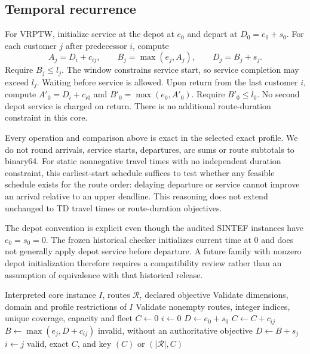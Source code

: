 \subsection{Temporal recurrence}
For VRPTW, initialize service at the depot at $e_0$ and depart at $D_0=e_0+s_0$. For each customer $j$ after predecessor $i$, compute
\[
A_j=D_i+c_{ij},\qquad B_j=\max(e_j,A_j),\qquad D_j=B_j+s_j.
\]
Require $B_j\leq l_j$. The window constrains service start, so service completion may exceed $l_j$. Waiting before service is allowed. Upon return from the last customer $i$, compute $A'_0=D_i+c_{i0}$ and $B'_0=\max(e_0,A'_0)$. Require $B'_0\leq l_0$. No second depot service is charged on return. There is no additional route-duration constraint in this core.

Every operation and comparison above is exact in the selected exact profile. We do not round arrivals, service starts, departures, arc sums or route subtotals to binary64. For static nonnegative travel times with no independent duration constraint, this earliest-start schedule suffices to test whether any feasible schedule exists for the route order: delaying departure or service cannot improve an arrival relative to an upper deadline. This reasoning does not extend unchanged to TD travel times or route-duration objectives.

The depot convention is explicit even though the audited SINTEF instances have $e_0=s_0=0$. The frozen historical checker initializes current time at 0 and does not generally apply depot service before departure. A future family with nonzero depot initialization therefore requires a compatibility review rather than an assumption of equivalence with that historical release.

\begin{algorithm}[htbp]
\caption{Exact evaluation of a materialized static solution}
\begin{algorithmic}[1]
\Require Interpreted core instance $I$, routes $\mathcal R$, declared objective
\State Validate dimensions, domain and profile restrictions of $I$
\State Validate nonempty routes, integer indices, unique coverage, capacity and fleet
\State $C\gets0$
\State $i\gets0$
 \State $D\gets e_0+s_0$ \EndIf
{}
\State $C\gets C+c_{ij}$
\State $B\gets\max(e_j,D+c_{ij})$
 \State \Return invalid, without an authoritative objective \EndIf
{} \State $D\gets B+s_j$ \EndIf
\EndIf
\State $i\gets j$
\EndFor
\EndFor
\State \Return valid, exact $C$, and key $(C)$ or $(|\mathcal R|,C)$
\end{algorithmic}
\end{algorithm}

